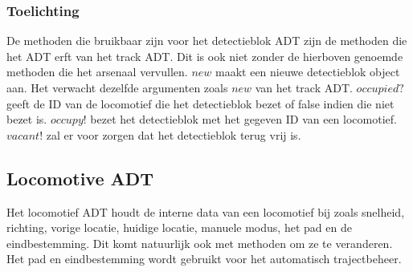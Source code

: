 \documentclass{article}
\begin{document}
\subsubsection{Toelichting}
De methoden die bruikbaar zijn voor het detectieblok ADT zijn de methoden die het ADT erft van het track ADT. 
Dit is ook niet zonder de hierboven genoemde methoden die het arsenaal vervullen. $new$ maakt een nieuwe
detectieblok object aan. Het verwacht dezelfde argumenten zoals $new$ van het track ADT. $occupied?$ geeft de ID van de locomotief die
het detectieblok bezet of false indien die niet bezet is. $occupy!$ bezet het detectieblok met het gegeven ID van een locomotief. 
$vacant!$ zal er voor zorgen dat het detectieblok terug vrij is. 
\subsection{Locomotive ADT}
Het locomotief ADT houdt de interne data van een locomotief bij zoals snelheid, richting, vorige locatie, huidige locatie, manuele modus,
het pad en de eindbestemming. Dit komt natuurlijk ook met methoden om ze te veranderen. 
Het pad en eindbestemming wordt gebruikt voor het automatisch trajectbeheer. 
\end{document}
